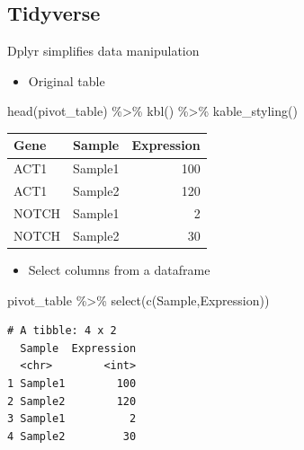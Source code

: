 \documentclass[
  letterpaper,
  DIV=11,
  numbers=noendperiod,
  landscape]{scrartcl}
\newenvironment{Shaded}{\begin{snugshade}}{\end{snugshade}}
\newcommand{\FunctionTok}[1]{\textcolor[rgb]{0.28,0.35,0.67}{#1}}
\newcommand{\NormalTok}[1]{\textcolor[rgb]{0.00,0.23,0.31}{#1}}
\newcommand{\SpecialCharTok}[1]{\textcolor[rgb]{0.37,0.37,0.37}{#1}}
\providecommand{\tightlist}{%
  \setlength{\itemsep}{0pt}\setlength{\parskip}{0pt}}\usepackage{longtable,booktabs,array}
\begin{document}
\hypertarget{tidyverse-9}{%
\subsection{Tidyverse}\label{tidyverse-9}}

Dplyr simplifies data manipulation

\begin{itemize}
\tightlist
\item
  Original table
\end{itemize}

\begin{Shaded}
\begin{Highlighting}[]
\FunctionTok{head}\NormalTok{(pivot\_table) }\SpecialCharTok{\%\textgreater{}\%}
  \FunctionTok{kbl}\NormalTok{() }\SpecialCharTok{\%\textgreater{}\%}
  \FunctionTok{kable\_styling}\NormalTok{()}
\end{Highlighting}
\end{Shaded}

\begin{table}
\centering
\begin{tabular}[t]{l|l|r}
\hline
Gene & Sample & Expression\\
\hline
ACT1 & Sample1 & 100\\
\hline
ACT1 & Sample2 & 120\\
\hline
NOTCH & Sample1 & 2\\
\hline
NOTCH & Sample2 & 30\\
\hline
\end{tabular}
\end{table}

\begin{itemize}
\tightlist
\item
  Select columns from a dataframe
\end{itemize}

\begin{Shaded}
\begin{Highlighting}[]
\NormalTok{pivot\_table }\SpecialCharTok{\%\textgreater{}\%}
  \FunctionTok{select}\NormalTok{(}\FunctionTok{c}\NormalTok{(Sample,Expression))}
\end{Highlighting}
\end{Shaded}

\begin{verbatim}
# A tibble: 4 x 2
  Sample  Expression
  <chr>        <int>
1 Sample1        100
2 Sample2        120
3 Sample1          2
4 Sample2         30
\end{verbatim}
\end{document}
